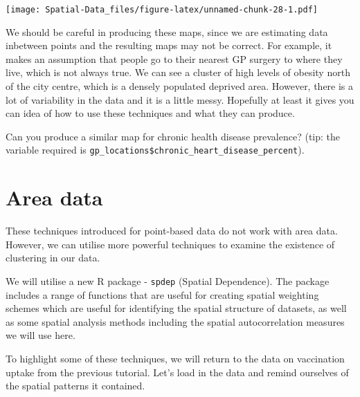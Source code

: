 \documentclass[
]{book}
\begin{document}
\texttt{[image: Spatial-Data\_files/figure-latex/unnamed-chunk-28-1.pdf]}

We should be careful in producing these maps, since we are estimating data inbetween points and the resulting maps may not be correct. For example, it makes an assumption that people go to their nearest GP surgery to where they live, which is not always true. We can see a cluster of high levels of obesity north of the city centre, which is a densely populated deprived area. However, there is a lot of variability in the data and it is a little messy. Hopefully at least it gives you can idea of how to use these techniques and what they can produce.

Can you produce a similar map for chronic health disease prevalence? (tip: the variable required is \texttt{gp\_locations\$chronic\_heart\_disease\_percent}).

\hypertarget{area-data}{%
\section{Area data}\label{area-data}}

These techniques introduced for point-based data do not work with area data. However, we can utilise more powerful techniques to examine the existence of clustering in our data.

We will utilise a new R package - \texttt{spdep} (Spatial Dependence). The package includes a range of functions that are useful for creating spatial weighting schemes which are useful for identifying the spatial structure of datasets, as well as some spatial analysis methods including the spatial autocorrelation measures we will use here.

To highlight some of these techniques, we will return to the data on vaccination uptake from the previous tutorial. Let's load in the data and remind ourselves of the spatial patterns it contained.
\end{document}
